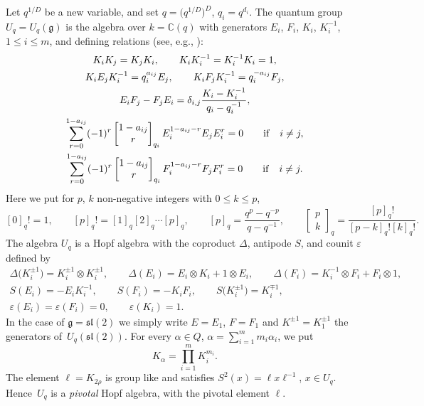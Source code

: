 \documentclass[pdftex]{sigma}%
\numberwithin{equation}{section}
\numberwithin{figure}{section}
\begin{document}
Let $q^{1/D}$ be a new variable, and set $q=\big(q^{1/D}\big)^D$, $q_i=q^{d_i}$. The quantum group $U_q = U_q(\mathfrak{g})$ is the algebra over $k=\mathbb {C}(q)$ with generators $E_i$, $F_i$, $K_i$, $K_i^{-1}$, $1\leq i \leq m$, and defining relations (see, e.g., \cite[Chapter~9.1]{CP}):
\begin{gather}
K_iK_j=K_jK_i ,\qquad K_iK_i^{-1}=K_i^{-1}K_i=1 ,\nonumber\\
K_iE_jK_i^{-1}=q_i^{a_{ij}}E_j ,\qquad K_iF_jK_i^{-1}=q_i^{-a_{ij}}F_j,\nonumber\\
E_iF_j-F_jE_i=\delta_{i,j}\frac{K_i-K_i^{-1}}{q_i-q_i^{-1}},\label{EFK}\\
\sum_{r=0}^{1-a_{ij}} (-1)^r \begin{bmatrix} 1-a_{ij} \\ r \end{bmatrix}_{q_i} E_i^{1-a_{ij}-r}E_jE_i^{r} = 0 \qquad {\rm if}\quad i\ne j,\label{Serre1}\\
\sum_{r=0}^{1-a_{ij}} (-1)^r \begin{bmatrix} 1-a_{ij} \\ r \end{bmatrix}_{q_i} F_i^{1-a_{ij}-r}F_jF_i^{r} = 0 \qquad {\rm if}\quad i\ne j.\label{Serre2}
\end{gather}
Here we put for $p$, $k$ non-negative integers with $0\leq k\leq p$,
\[
[0]_q! =1 ,\qquad [p]_q! =[1]_q[2]_q\cdots[p]_q ,\qquad [p]_q = \frac{q^p-q^{-p}}{q- q^{-1}},\qquad \begin{bmatrix} p \\ k \end{bmatrix}_{q} =\frac{[p]_q! }{[p-k]_q![k]_q!}.
\]
The algebra $U_q$ is a Hopf algebra with the coproduct $\Delta$, antipode $S$, and counit $\varepsilon$ defined by
\begin{gather*}
\Delta\big(K_i^{\pm 1}\big)=K_i^{\pm 1}\otimes K_i^{\pm 1} ,\qquad \Delta(E_i)=E_i\otimes K_i+1\otimes E_i ,\qquad \Delta(F_i)=K_i^{-1}\otimes F_i + F_i\otimes 1,\\ S(E_i) = -E_iK_i^{-1} ,\qquad S(F_i) = -K_iF_i ,\qquad S\big(K_i^{\pm 1}\big) = K_i^{\mp 1},\\ \varepsilon(E_i) = \varepsilon(F_i)=0,\qquad \varepsilon(K_i)=1.
\end{gather*}
In the case of $\mathfrak{g}={\mathfrak{sl}}(2)$ we simply write $E=E_1$, $F=F_1$ and $K^{\pm 1} = K_1^{\pm 1}$ the generators of~$U_q({\mathfrak{sl}}(2))$. For every $\alpha\in Q$, $\alpha=\sum_{i=1}^m m_i\alpha_i$, we put
\[K_\alpha=\prod_{i=1}^m K_i^{m_i}.\]
The element $\ell =K_{2\rho }$ is group like and satisfies $S^2(x)=\ell x \ell^{-1}$, $x\in U_q$. Hence~$U_q$ is a {\it pivotal} Hopf algebra, with the pivotal element $\ell$.
\end{document}
